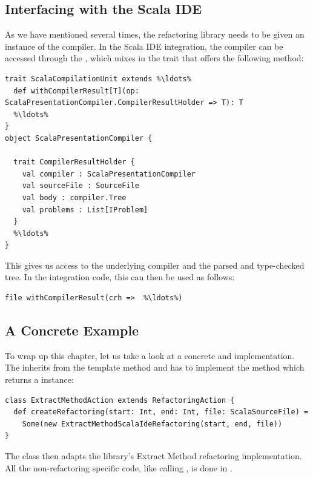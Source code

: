 \documentclass[10pt,a4paper,oneside]{scrreprt}
\begin{document}
\subsection{Interfacing with the Scala IDE}

As we have mentioned several times, the refactoring library needs to be given an instance of the compiler. In the Scala IDE integration, the compiler can be accessed through the , which mixes in the  trait that offers the following method:

\begin{lstlisting}
trait ScalaCompilationUnit extends %\ldots%
  def withCompilerResult[T](op: ScalaPresentationCompiler.CompilerResultHolder => T): T
  %\ldots%
}
object ScalaPresentationCompiler {
  
  trait CompilerResultHolder {
    val compiler : ScalaPresentationCompiler
    val sourceFile : SourceFile
    val body : compiler.Tree
    val problems : List[IProblem]
  }
  %\ldots%
}
\end{lstlisting}

This gives us access to the underlying compiler and the parsed and type-checked tree. In the integration code, this can then be used as follows:

\begin{lstlisting}
file withCompilerResult(crh =>  %\ldots%)
\end{lstlisting}

\subsection{A Concrete Example}

To wrap up this chapter, let us take a look at a  concrete  and  implementation. The  inherits from the  template method and has to implement the  method which returns a  instance:

\begin{lstlisting}
class ExtractMethodAction extends RefactoringAction {
  def createRefactoring(start: Int, end: Int, file: ScalaSourceFile) = 
    Some(new ExtractMethodScalaIdeRefactoring(start, end, file))
}
\end{lstlisting}

The  class then adapts the library's Extract Method refactoring implementation. All the non-refactoring specific code, like calling , is done in .
\end{document}
